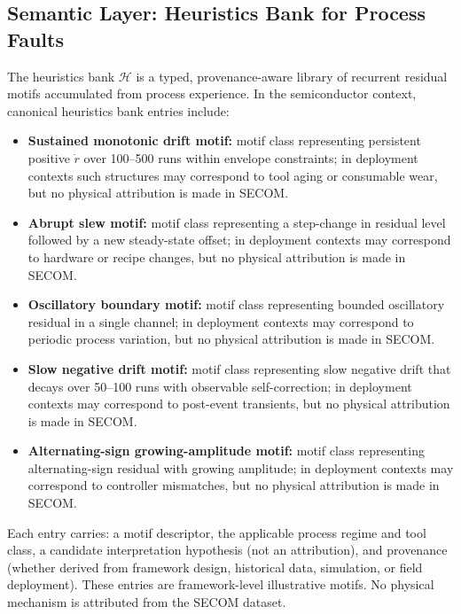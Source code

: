 \documentclass[11pt,letterpaper]{article}
\theoremstyle{scresult}
\begin{document}
\subsection{Semantic Layer: Heuristics Bank for Process Faults}

The heuristics bank $\mathcal{H}$ is a typed, provenance-aware library of
recurrent residual motifs accumulated from process experience. In the
semiconductor context, canonical heuristics bank entries include:

\begin{itemize}
  \item \textbf{Sustained monotonic drift motif:} motif class representing
        persistent positive $\dot{r}$ over 100--500 runs within envelope
        constraints; in deployment contexts such structures may correspond to
        tool aging or consumable wear, but no physical attribution is made in
        SECOM.
  \item \textbf{Abrupt slew motif:} motif class representing a step-change in
        residual level followed by a new steady-state offset; in deployment
        contexts may correspond to hardware or recipe changes, but no
        physical attribution is made in SECOM.
  \item \textbf{Oscillatory boundary motif:} motif class representing bounded
        oscillatory residual in a single channel; in deployment contexts may
        correspond to periodic process variation, but no physical attribution
        is made in SECOM.
  \item \textbf{Slow negative drift motif:} motif class representing slow
        negative drift that decays over 50--100 runs with observable
        self-correction; in deployment contexts may correspond to post-event
        transients, but no physical attribution is made in SECOM.
  \item \textbf{Alternating-sign growing-amplitude motif:} motif class
        representing alternating-sign residual with growing amplitude; in
        deployment contexts may correspond to controller mismatches, but no
        physical attribution is made in SECOM.
\end{itemize}

Each entry carries: a motif descriptor, the applicable process regime and tool
class, a candidate interpretation hypothesis (not an attribution), and provenance
(whether derived from framework design, historical data, simulation, or field
deployment). These entries are framework-level illustrative motifs. No physical
mechanism is attributed from the SECOM dataset.
\end{document}
